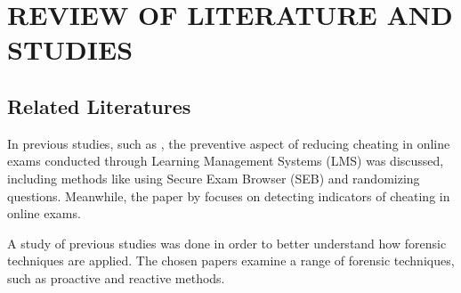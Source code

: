 \chapter{REVIEW OF LITERATURE AND STUDIES} \label{cap:chapter2}



\section{Related Literatures}
In previous studies, such as \citet{sylla2022secure}, the preventive aspect of reducing cheating in online exams conducted through Learning Management Systems (LMS) was discussed, including methods like using Secure Exam Browser (SEB) and randomizing questions. Meanwhile, the paper by \citet{ranger2020detection} focuses on detecting indicators of cheating in online exams.


A study of previous studies was done in order to better understand how forensic techniques are applied. The chosen papers examine a range of forensic techniques, such as proactive and reactive methods.

